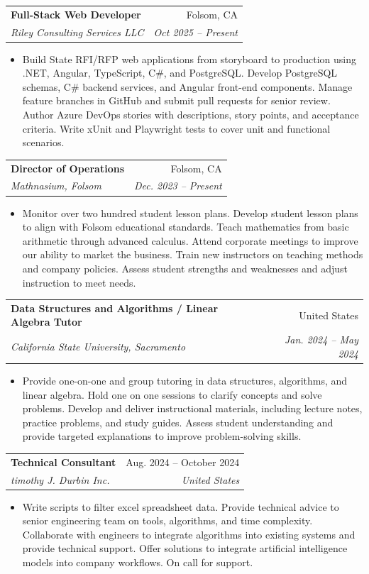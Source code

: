 \documentclass[10pt,letterpaper]{article}
\makeatletter
\newcommand{\resumeItem}[1]{\item {#1}}
\newcommand{\resumeSubheading}[4]{
  \begin{tabularx}{\textwidth}{@{}X r@{}}
    \textbf{#1} & #2 \\
    \textit{#3} & \textit{#4} \\
  \end{tabularx}
}
\makeatother
\begin{document}
\resumeSubheading
{Full-Stack Web Developer}{Folsom, CA}
{Riley Consulting Services LLC}{Oct 2025 -- Present}
\begin{itemize}
    \resumeItem{Build State RFI/RFP web applications from storyboard to production using .NET, Angular, TypeScript, C\#, and PostgreSQL.
        Develop PostgreSQL schemas, C\# backend services, and Angular front-end components.
        Manage feature branches in GitHub and submit pull requests for senior review.
        Author Azure DevOps stories with descriptions, story points, and acceptance criteria.
        Write xUnit and Playwright tests to cover unit and functional scenarios.}
\end{itemize}
\resumeSubheading
{Director of Operations}{Folsom, CA}
{Mathnasium, Folsom}{Dec. 2023 -- Present}
\begin{itemize}
    \resumeItem{Monitor over two hundred student lesson plans. Develop student lesson plans to align with Folsom educational standards.
        Teach mathematics from basic arithmetic through advanced calculus. Attend corporate meetings to improve our ability to market the business.
        Train new instructors on teaching methods and company policies.
        Assess student strengths and weaknesses and adjust instruction to meet needs.}
\end{itemize}
\resumeSubheading
{Data Structures and Algorithms / Linear Algebra Tutor}{United States}
{California State University, Sacramento}{Jan. 2024 -- May 2024}
\begin{itemize}
    \resumeItem{Provide one-on-one and group tutoring in data structures, algorithms, and linear algebra. Hold one on one sessions to clarify concepts and solve problems. Develop and deliver instructional materials, including lecture notes, practice problems, and study guides. Assess student understanding and provide targeted explanations to improve problem-solving skills.}
\end{itemize}
\resumeSubheading
{Technical Consultant}{Aug. 2024 -- October 2024}
{timothy J. Durbin Inc. }{United States}
\begin{itemize}
    \resumeItem{Write scripts to filter excel spreadsheet data. Provide technical advice to senior engineering team on tools, algorithms, and time complexity. Collaborate with engineers to integrate algorithms into existing systems and provide technical support. Offer solutions to integrate artificial intelligence models into company workflows. On call for support.}
\end{itemize}
\end{document}

